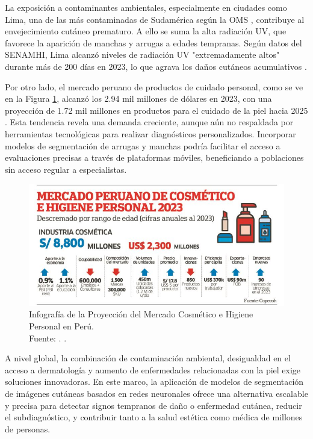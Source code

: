 La exposición a contaminantes ambientales, especialmente en ciudades como Lima, una de las más contaminadas de Sudamérica según la OMS \parencite{who2023air}, contribuye al envejecimiento cutáneo prematuro. A ello se suma la alta radiación UV, que favorece la aparición de manchas y arrugas a edades tempranas. Según datos del SENAMHI, Lima alcanzó niveles de radiación UV "extremadamente altos" durante más de 200 días en 2023, lo que agrava los daños cutáneos acumulativos \parencite{senamhi2023uv}.

Por otro lado, el mercado peruano de productos de cuidado personal, como se ve en la Figura \ref{1:fig4}, alcanzó los 2.94 mil millones de dólares en 2023, con una proyección de 1.72 mil millones en productos para el cuidado de la piel hacia 2025 \parencite{statista2023peru}. Esta tendencia revela una demanda creciente, aunque aún no respaldada por herramientas tecnológicas para realizar diagnósticos personalizados. Incorporar modelos de segmentación de arrugas y manchas podría facilitar el acceso a evaluaciones precisas a través de plataformas móviles, beneficiando a poblaciones sin acceso regular a especialistas.

\begin{figure}[H]
	\begin{center}
		\includegraphics[width=1\textwidth]{1/figures/careperu.jpg}
		\caption[Infografía de la Proyección del Mercado Cosmético e Higiene Personal en Perú]{Infografía de la Proyección del Mercado Cosmético e Higiene Personal en Perú.\\
			Fuente: \cite{elperuano2025belleza}. .}
		\label{1:fig4}
	\end{center}
\end{figure}

A nivel global, la combinación de contaminación ambiental, desigualdad en el acceso a dermatología y aumento de enfermedades relacionadas con la piel exige soluciones innovadoras. En este marco, la aplicación de modelos de segmentación de imágenes cutáneas basados en redes neuronales ofrece una alternativa escalable y precisa para detectar signos tempranos de daño o enfermedad cutánea, reducir el subdiagnóstico, y contribuir tanto a la salud estética como médica de millones de personas.

